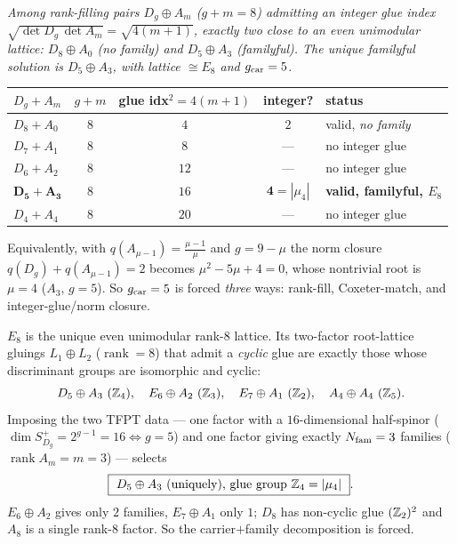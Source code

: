 \begin{keybox}
\emph{Among rank-filling pairs $D_g\oplus A_m$ ($g+m=8$) admitting an integer glue index
$\sqrt{\det D_g\,\det A_m}=\sqrt{4(m+1)}$, exactly two close to an even unimodular lattice: $D_8\oplus A_0$
(no family) and $D_5\oplus A_3$ (familyful). The unique familyful solution is $D_5\oplus A_3$, with
lattice $\cong E_8$ and $g_{\mathrm{car}}=5$.}
\begin{center}\scriptsize\renewcommand{\arraystretch}{1.05}
\begin{tabular}{@{}lcccl@{}}
\toprule
$D_g{+}A_m$ & $g{+}m$ & glue idx$^2{=}4(m{+}1)$ & integer? & status \\
\midrule
$D_8{+}A_0$ & $8$ & $4$ & $2$ & valid, \emph{no family} \\
$D_7{+}A_1$ & $8$ & $8$ & --- & no integer glue \\
$D_6{+}A_2$ & $8$ & $12$ & --- & no integer glue \\
$\mathbf{D_5{+}A_3}$ & $8$ & $16$ & $\mathbf 4{=}|\mu_4|$ & \textbf{valid, familyful, $E_8$} \\
$D_4{+}A_4$ & $8$ & $20$ & --- & no integer glue \\
\bottomrule
\end{tabular}
\end{center}
Equivalently, with $q(A_{\mu-1})=\tfrac{\mu-1}{\mu}$ and $g=9-\mu$ the norm closure
$q(D_g)+q(A_{\mu-1})=2$ becomes $\mu^2-5\mu+4=0$, whose nontrivial root is $\mu=4$ ($A_3$, $g=5$). So
$g_{\mathrm{car}}=5$ is forced \emph{three} ways: rank-fill, Coxeter-match, and integer-glue/norm closure. \mE\ 
\end{keybox}

\begin{keybox}
$E_8$ is the unique even unimodular rank-$8$ lattice. Its two-factor root-lattice gluings $L_1\oplus L_2$
($\operatorname{rank}=8$) that admit a \emph{cyclic} glue are exactly those whose discriminant groups are
isomorphic and cyclic:
\[
  D_5\oplus A_3\ (\Z_4),\quad E_6\oplus A_2\ (\Z_3),\quad E_7\oplus A_1\ (\Z_2),\quad A_4\oplus A_4\ (\Z_5).
\]
Imposing the two TFPT data --- one factor with a $16$-dimensional half-spinor ($\dim S^+_{D_g}=2^{g-1}=16\Leftrightarrow g=5$)
and one factor giving exactly $N_{\mathrm{fam}}=3$ families ($\operatorname{rank}A_m=m=3$) --- selects
\[
  \boxed{\ D_5\oplus A_3\ \text{(uniquely), glue group }\Z_4=|\mu_4|\ } .
\]
$E_6{\oplus}A_2$ gives only $2$ families, $E_7{\oplus}A_1$ only $1$; $D_8$ has non-cyclic glue
$(\mathbb{Z}_2)^2$ and $A_8$ is a single rank-$8$ factor. So the carrier$+$family decomposition is forced.
\end{keybox}

